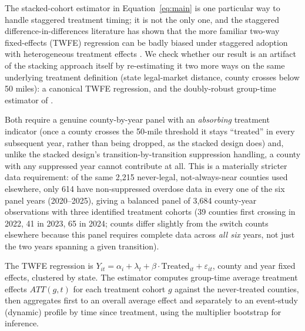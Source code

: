 \documentclass[12pt]{article}
\begin{document}
The stacked-cohort estimator in Equation~\ref{eq:main} is one
particular way to handle staggered treatment timing; it is not the
only one, and the staggered difference-in-differences literature has
shown that the more familiar two-way fixed-effects (TWFE) regression
can be badly biased under staggered adoption with heterogeneous
treatment effects \citep{GoodmanBacon2021}. We check whether our
result is an artifact of the stacking approach itself by re-estimating
it two more ways on the same underlying treatment definition (state
legal-market distance, county crosses below 50 miles): a canonical
TWFE regression, and the doubly-robust group-time estimator of
\citet{CallawaySantAnna2021}.

Both require a genuine county-by-year panel with an \emph{absorbing}
treatment indicator (once a county crosses the 50-mile threshold it
stays ``treated'' in every subsequent year, rather than being dropped,
as the stacked design does) and, unlike the stacked design's
transition-by-transition suppression handling, a county with any
suppressed year cannot contribute at all. This is a materially
stricter data requirement: of the same 2,215 never-legal, not-always-near
counties used elsewhere, only 614 have non-suppressed overdose data in
every one of the six panel years (2020--2025), giving a balanced panel
of 3,684 county-year observations with three identified treatment
cohorts (39 counties first crossing in 2022, 41 in 2023, 65 in 2024;
counts differ slightly from the switch counts elsewhere because this
panel requires complete data across \emph{all six} years, not just the
two years spanning a given transition).

The TWFE regression is $Y_{it} = \alpha_i + \lambda_t + \beta \cdot
\text{Treated}_{it} + \varepsilon_{it}$, county and year fixed effects,
clustered by state. The \citet{CallawaySantAnna2021} estimator computes
group-time average treatment effects $ATT(g,t)$ for each treatment
cohort $g$ against the never-treated counties, then aggregates first to
an overall average effect and separately to an event-study (dynamic)
profile by time since treatment, using the multiplier bootstrap for
inference.
\end{document}
